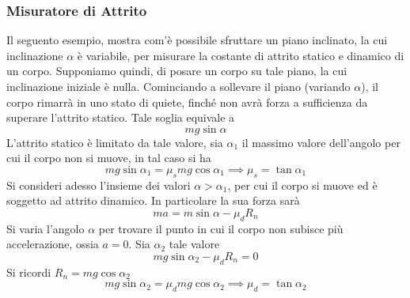 \documentclass[10pt, letterpaper]{report}
\begin{document}
\subsubsection{Misuratore di Attrito}
Il seguento esempio, mostra com'è possibile sfruttare un piano inclinato, la cui inclinazione 
$\alpha$ è variabile, per misurare la costante di attrito statico e dinamico di un corpo. Supponiamo quindi, di posare un 
corpo su tale piano, la cui inclinazione iniziale è nulla. Cominciando a sollevare il piano (variando $\alpha$), il corpo 
rimarrà in uno stato di quiete, finché non avrà forza a sufficienza da superare l'attrito statico. Tale 
soglia equivale a $$mg\sin\alpha $$
L'attrito statico è limitato da tale valore, sia $\alpha_1$ il massimo valore dell'angolo per cui 
il corpo non si muove, in tal caso si ha 
$$ mg\sin\alpha_1=\mu_smg\cos\alpha_1\implies\mu_s=\tan\alpha_1$$
Si consideri adesso l'insieme dei valori $\alpha>\alpha_1$, per cui il corpo si muove ed è soggetto 
ad attrito dinamico. In particolare la sua forza sarà 
$$ma=m\sin\alpha-\mu_dR_n $$
Si varia l'angolo $\alpha$ per trovare il punto in cui il corpo non subisce più accelerazione, ossia $a=0$. Sia 
$\alpha_2$ tale valore 
$$ mg\sin\alpha_2-\mu_dR_n=0$$
Si ricordi $R_n=mg\cos\alpha_2$
$$ mg\sin\alpha_2=\mu_dmg\cos\alpha_2\implies \mu_d=\tan\alpha_2$$
\flowerLine 
\end{document}
